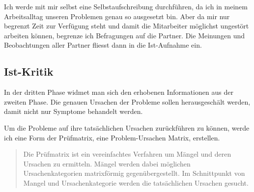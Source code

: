 Ich werde mit mir selbst eine Selbstaufschreibung durchführen, da ich in meinem 
Arbeitsalltag unseren Problemen genau so ausgesetzt bin. Aber da mir nur begrenzt
Zeit zur Verfügung steht und damit die Mitarbeiter möglichst ungestört arbeiten
können, begrenze ich Befragungen auf die Partner. Die Meinungen und Beobachtungen
aller Partner fliesst dann in die Ist-Aufnahme ein.

\subsection{Ist-Kritik}
In der dritten Phase widmet man sich den erhobenen Informationen aus der zweiten Phase. 
Die genauen Ursachen der Probleme sollen herausgeschält werden, damit nicht nur 
Symptome behandelt werden. 

Um die Probleme auf ihre tatsächlichen Ursachen zurückführen zu können,
werde ich eine Form der Prüfmatrix, eine Problem-Ursachen Matrix, erstellen.

\begin{quotation}
    Die Prüfmatrix ist ein vereinfachtes Verfahren um Mängel und deren Ursachen 
    zu ermitteln. Mängel werden dabei möglichen Ursachenkategorien matrixförmig 
    gegenübergestellt. Im Schnittpunkt von Mangel und Ursachenkategorie werden 
    die tatsächlichen Ursachen gesucht.\cite{schmidt2000methode}
\end{quotation}